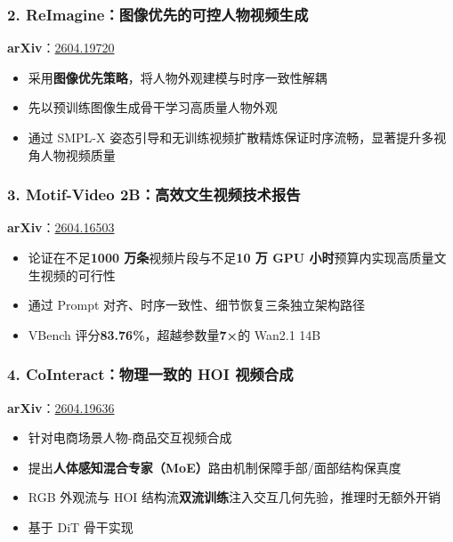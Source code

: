 \subsubsection{2. ReImagine：图像优先的可控人物视频生成}

\textbf{arXiv}：\href{https://arxiv.org/abs/2604.19720}{2604.19720}

\begin{itemize}[leftmargin=1.5em]
  \item 采用\textbf{图像优先策略}，将人物外观建模与时序一致性解耦
  \item 先以预训练图像生成骨干学习高质量人物外观
  \item 通过 SMPL-X 姿态引导和无训练视频扩散精炼保证时序流畅，显著提升多视角人物视频质量
\end{itemize}

\subsubsection{3. Motif-Video 2B：高效文生视频技术报告}

\textbf{arXiv}：\href{https://arxiv.org/abs/2604.16503}{2604.16503}

\begin{itemize}[leftmargin=1.5em]
  \item 论证在不足\textbf{1000 万条}视频片段与不足\textbf{10 万 GPU 小时}预算内实现高质量文生视频的可行性
  \item 通过 Prompt 对齐、时序一致性、细节恢复三条独立架构路径
  \item VBench 评分\textbf{83.76\%}，超越参数量\textbf{7×}的 Wan2.1 14B
\end{itemize}

\subsubsection{4. CoInteract：物理一致的 HOI 视频合成}

\textbf{arXiv}：\href{https://arxiv.org/abs/2604.19636}{2604.19636}

\begin{itemize}[leftmargin=1.5em]
  \item 针对电商场景人物-商品交互视频合成
  \item 提出\textbf{人体感知混合专家（MoE）}路由机制保障手部/面部结构保真度
  \item RGB 外观流与 HOI 结构流\textbf{双流训练}注入交互几何先验，推理时无额外开销
  \item 基于 DiT 骨干实现
\end{itemize}

